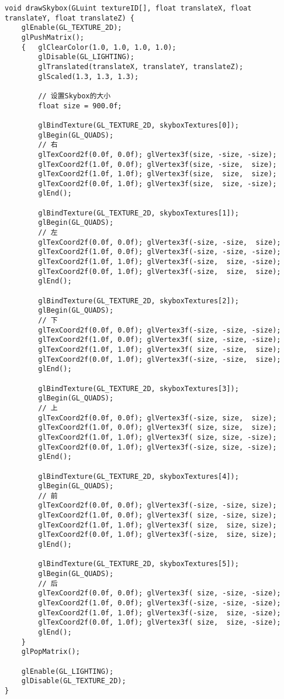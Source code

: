 \documentclass[12pt,hyperref,a4paper,UTF8]{ctexart}
\begin{document}
\begin{verbatim}
void drawSkybox(GLuint textureID[], float translateX, float translateY, float translateZ) {
    glEnable(GL_TEXTURE_2D);
    glPushMatrix();
    {   glClearColor(1.0, 1.0, 1.0, 1.0);
        glDisable(GL_LIGHTING);
        glTranslated(translateX, translateY, translateZ);
        glScaled(1.3, 1.3, 1.3);
        
        // 设置Skybox的大小
        float size = 900.0f;

        glBindTexture(GL_TEXTURE_2D, skyboxTextures[0]);
        glBegin(GL_QUADS);
        // 右
        glTexCoord2f(0.0f, 0.0f); glVertex3f(size, -size, -size);
        glTexCoord2f(1.0f, 0.0f); glVertex3f(size, -size,  size);
        glTexCoord2f(1.0f, 1.0f); glVertex3f(size,  size,  size);
        glTexCoord2f(0.0f, 1.0f); glVertex3f(size,  size, -size);
        glEnd();

        glBindTexture(GL_TEXTURE_2D, skyboxTextures[1]);
        glBegin(GL_QUADS);
        // 左
        glTexCoord2f(0.0f, 0.0f); glVertex3f(-size, -size,  size);
        glTexCoord2f(1.0f, 0.0f); glVertex3f(-size, -size, -size);
        glTexCoord2f(1.0f, 1.0f); glVertex3f(-size,  size, -size);
        glTexCoord2f(0.0f, 1.0f); glVertex3f(-size,  size,  size);
        glEnd();

        glBindTexture(GL_TEXTURE_2D, skyboxTextures[2]);
        glBegin(GL_QUADS);
        // 下
        glTexCoord2f(0.0f, 0.0f); glVertex3f(-size, -size, -size);
        glTexCoord2f(1.0f, 0.0f); glVertex3f( size, -size, -size);
        glTexCoord2f(1.0f, 1.0f); glVertex3f( size, -size,  size);
        glTexCoord2f(0.0f, 1.0f); glVertex3f(-size, -size,  size);
        glEnd();

        glBindTexture(GL_TEXTURE_2D, skyboxTextures[3]);
        glBegin(GL_QUADS);
        // 上
        glTexCoord2f(0.0f, 0.0f); glVertex3f(-size, size,  size);
        glTexCoord2f(1.0f, 0.0f); glVertex3f( size, size,  size);
        glTexCoord2f(1.0f, 1.0f); glVertex3f( size, size, -size);
        glTexCoord2f(0.0f, 1.0f); glVertex3f(-size, size, -size);
        glEnd();

        glBindTexture(GL_TEXTURE_2D, skyboxTextures[4]);
        glBegin(GL_QUADS);
        // 前
        glTexCoord2f(0.0f, 0.0f); glVertex3f(-size, -size, size);
        glTexCoord2f(1.0f, 0.0f); glVertex3f( size, -size, size);
        glTexCoord2f(1.0f, 1.0f); glVertex3f( size,  size, size);
        glTexCoord2f(0.0f, 1.0f); glVertex3f(-size,  size, size);
        glEnd();

        glBindTexture(GL_TEXTURE_2D, skyboxTextures[5]);
        glBegin(GL_QUADS);
        // 后
        glTexCoord2f(0.0f, 0.0f); glVertex3f( size, -size, -size);
        glTexCoord2f(1.0f, 0.0f); glVertex3f(-size, -size, -size);
        glTexCoord2f(1.0f, 1.0f); glVertex3f(-size,  size, -size);
        glTexCoord2f(0.0f, 1.0f); glVertex3f( size,  size, -size);
        glEnd();
    }
    glPopMatrix();

    glEnable(GL_LIGHTING);
    glDisable(GL_TEXTURE_2D);
}
\end{verbatim}
\end{document}
